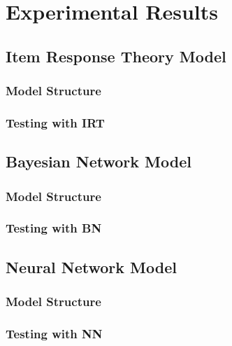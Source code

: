 \chapter{Experimental Results}
\section{Item Response Theory Model}
\subsection{Model Structure}
\subsection{Testing with IRT}

\section{Bayesian Network Model}
\subsection{Model Structure}

\subsection{Testing with BN}

\section{Neural Network Model}
\subsection{Model Structure}
\subsection{Testing with NN}